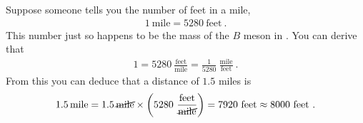 \documentclass[12pt, oneside]{report}    %
\begin{document}
\begin{example}
Suppose someone tells you the number of feet in a mile,
\begin{align}
    1~\text{mile} = 5280~\text{feet} \ .
\end{align}
This number just so happens to be the mass of the $B$ meson in .
You can derive that
\begin{align}
    1 = 5280~\frac{\text{feet}}{\text{mile}}
    = \frac{1}{5280}~\frac{\text{mile}}{\text{feet}} \ .
\end{align}
From this you can deduce that a distance of $1.5$ miles is
\begin{align}
    1.5\,\text{mile} = 
    1.5\,\cancel{\text{mile}} \times \left(5280~\frac{\text{feet}}{\cancel{\text{mile}}}\right) = 
    7920~\text{feet} 
    \approx 8000~\text{feet} 
    \ .
\end{align}
\end{example}
\end{document}
